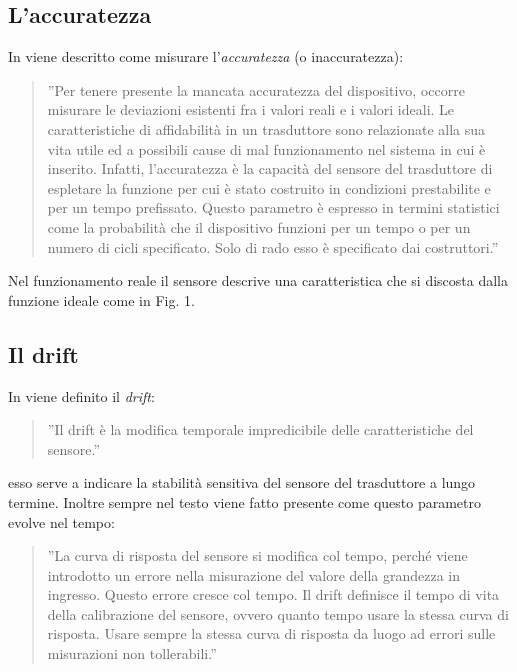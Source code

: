 \documentclass[a4paper]{report} %
\begin{document}
\subsection{L'accuratezza}
In \cite{art:rif.13} viene descritto come misurare l'\textit{accuratezza} (o inaccuratezza):
\begin{quote}
	''Per tenere presente la mancata accuratezza del dispositivo, occorre misurare le deviazioni esistenti fra i valori reali e i valori ideali. 
	Le caratteristiche di affidabilità in un trasduttore sono relazionate alla sua vita utile ed a possibili cause di mal funzionamento nel sistema in cui è inserito.
	Infatti, l'accuratezza è la capacità del sensore del trasduttore di espletare la funzione per cui è stato costruito in condizioni prestabilite e per un tempo prefissato. Questo parametro è espresso in termini statistici come la probabilità che il dispositivo funzioni per un tempo o per un numero di cicli specificato. Solo di rado esso è specificato dai costruttori.''
\end{quote}
Nel funzionamento reale il sensore descrive una caratteristica che si discosta dalla funzione ideale
come in Fig. 1.

\subsection{Il drift}
In \cite{art:rif.14} viene definito il \textit{drift}:
\begin{quote}
	''Il drift è la modifica temporale impredicibile delle caratteristiche del sensore.''  
\end{quote}
esso serve a indicare la stabilità sensitiva del sensore del trasduttore a lungo termine.
Inoltre sempre nel testo \cite{art:rif.14} viene fatto presente come questo parametro evolve nel tempo:
\begin{quote}
	''La curva di risposta del sensore si modifica col tempo, perché viene introdotto un errore nella misurazione del valore della grandezza in ingresso. Questo errore cresce col tempo. Il drift definisce il tempo di vita della calibrazione del sensore, ovvero quanto tempo usare la stessa curva di risposta. Usare sempre la stessa curva di risposta da luogo ad errori sulle misurazioni non tollerabili.'' 
\end{quote}
\end{document}
